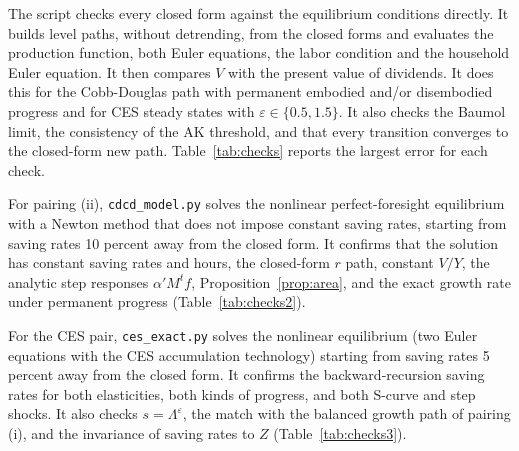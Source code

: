 \documentclass[11pt]{article}
\newcommand{\e}{\varepsilon}
\begin{document}
The script checks every closed form against the equilibrium conditions directly. It
builds level paths, without detrending, from the closed forms and evaluates the
production function, both Euler equations, the labor condition and the household
Euler equation. It then compares $V$ with the present value of dividends. It does this
for the Cobb-Douglas path with permanent embodied and/or disembodied progress and for
CES steady states with $\e\in\{0.5,1.5\}$. It also checks the Baumol limit, the
consistency of the AK threshold, and that every transition converges to the
closed-form new path. Table~\ref{tab:checks} reports the largest error for each check.

\begin{table}[h]\centering\scriptsize
\caption{Verification, pairing (i) (\texttt{ai\_model.py}): maximum absolute (or relative) errors.}\label{tab:checks}

\end{table}

For pairing (ii), \texttt{cdcd\_model.py} solves the nonlinear perfect-foresight
equilibrium with a Newton method that does not impose constant saving rates, starting
from saving rates 10 percent away from the closed form. It confirms that the solution
has constant saving rates and hours, the closed-form $r$ path, constant $V/Y$, the
analytic step responses $\alpha'M^tf$, Proposition~\ref{prop:area}, and the exact
growth rate under permanent progress (Table~\ref{tab:checks2}).

\begin{table}[h]\centering\scriptsize
\caption{Verification, pairing (ii) (\texttt{cdcd\_model.py}).}\label{tab:checks2}

\end{table}

For the CES pair, \texttt{ces\_exact.py} solves the nonlinear equilibrium (two Euler
equations with the CES accumulation technology) starting from saving rates 5 percent
away from the closed form. It confirms the backward-recursion saving rates for both
elasticities, both kinds of progress, and both S-curve and step shocks. It also checks
$s=\Lambda^\e$, the match with the balanced growth path of pairing (i), and the invariance
of saving rates to $Z$ (Table~\ref{tab:checks3}).

\begin{table}[h]\centering\scriptsize
\caption{Verification, CES pair (\texttt{ces\_exact.py}).}\label{tab:checks3}

\end{table}
\end{document}
